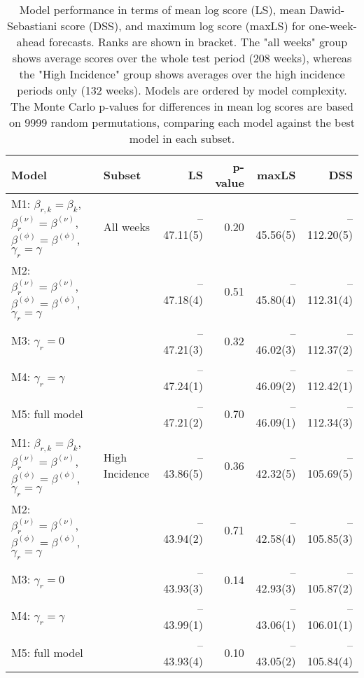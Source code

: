 \begin{table}[ht]
\centering
\begingroup\fontsize{9pt}{10pt}\selectfont
\begin{tabular}{ll|rrrr}
  \hline
Model & Subset & LS & p-value & maxLS & DSS \\ 
  \hline
M1: $\beta_{r,k} = \beta_{k}$, $\beta_{r}^{(\nu)} = \beta^{(\nu)}$, $\beta^{(\phi)} = \beta^{(\phi)}$, $\gamma_r = \gamma$ & All weeks & --47.11(5) & 0.20 & --45.56(5) & --112.20(5) \\ 
  M2: $\beta_{r}^{(\nu)} = \beta^{(\nu)}$, $\beta^{(\phi)} = \beta^{(\phi)}$, $\gamma_r = \gamma$ &  & --47.18(4) & 0.51 & --45.80(4) & --112.31(4) \\ 
  M3: $\gamma_r = 0$ &  & --47.21(3) & 0.32 & --46.02(3) & --112.37(2) \\ 
  M4: $\gamma_r = \gamma$ &  & --47.24(1) &  & --46.09(2) & --112.42(1) \\ 
  M5: full model &  & --47.21(2) & 0.70 & --46.09(1) & --112.34(3) \\ 
   \hline
M1: $\beta_{r,k} = \beta_{k}$, $\beta_{r}^{(\nu)} = \beta^{(\nu)}$, $\beta^{(\phi)} = \beta^{(\phi)}$, $\gamma_r = \gamma$ & High Incidence & --43.86(5) & 0.36 & --42.32(5) & --105.69(5) \\ 
  M2: $\beta_{r}^{(\nu)} = \beta^{(\nu)}$, $\beta^{(\phi)} = \beta^{(\phi)}$, $\gamma_r = \gamma$ &  & --43.94(2) & 0.71 & --42.58(4) & --105.85(3) \\ 
  M3: $\gamma_r = 0$ &  & --43.93(3) & 0.14 & --42.93(3) & --105.87(2) \\ 
  M4: $\gamma_r = \gamma$ &  & --43.99(1) &  & --43.06(1) & --106.01(1) \\ 
  M5: full model &  & --43.93(4) & 0.10 & --43.05(2) & --105.84(4) \\ 
   \hline
\end{tabular}
\endgroup
\caption{Model performance in terms of mean log score (LS),
             mean Dawid-Sebastiani score (DSS), and maximum log score (maxLS)
             for one-week-ahead forecasts.
             Ranks are shown in bracket.
             The "all weeks" group shows average scores over the
             whole test period (208 weeks),
             whereas the "High Incidence" group shows
             averages over the high incidence periods only (132 weeks).
             Models are ordered by model complexity.
             The Monte Carlo p-values for differences in mean log scores
             are based on 9999 random permutations,
             comparing each model against the best model in each subset.} 
\label{tab:forecast}
\end{table}
